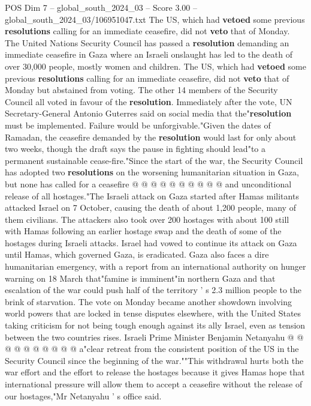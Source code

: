 \begin{textsample}{POS Dim 7 – global\_south\_2024\_03 – Score 3.00 – global\_south\_2024\_03/106951047.txt}  \label{ex:f7_pos_022}
The US, which had \textbf{vetoed} some previous \textbf{resolutions} calling for an immediate ceasefire, did not \textbf{veto} that of Monday.
The United Nations Security Council has passed a \textbf{resolution} demanding an immediate ceasefire in Gaza where an Israeli onslaught has led to the death of over 30,000 people, mostly women and children.
The US, which had \textbf{vetoed} some previous \textbf{resolutions} calling for an immediate ceasefire, did not \textbf{veto} that of Monday but abstained from voting.
The other 14 members of the Security Council all voted in favour of the \textbf{resolution}.
Immediately after the vote, UN Secretary-General Antonio Guterres said on social media that the"\textbf{resolution} must be implemented.
Failure would be unforgivable."Given the dates of Ramadan, the ceasefire demanded by the \textbf{resolution} would last for only about two weeks, though the draft says the pause in fighting should lead"to a permanent sustainable cease-fire."Since the start of the war, the Security Council has adopted two \textbf{resolutions} on the worsening humanitarian situation in Gaza, but none has called for a ceasefire @ @ @ @ @ @ @ @ @ @ and unconditional release of all hostages."The Israeli attack on Gaza started after Hamas militants attacked Israel on 7 October, causing the death of about 1,200 people, many of them civilians.
The attackers also took over 200 hostages with about 100 still with Hamas following an earlier hostage swap and the death of some of the hostages during Israeli attacks.
Israel had vowed to continue its attack on Gaza until Hamas, which governed Gaza, is eradicated.
Gaza also faces a dire humanitarian emergency, with a report from an international authority on hunger warning on 18 March that"famine is imminent"in northern Gaza and that escalation of the war could push half of the territory ' s 2.3 million people to the brink of starvation.
The vote on Monday became another showdown involving world powers that are locked in tense disputes elsewhere, with the United States taking criticism for not being tough enough against its ally Israel, even as tension between the two countries rises.
Israeli Prime Minister Benjamin Netanyahu @ @ @ @ @ @ @ @ @ @ a"clear retreat from the consistent position of the US in the Security Council since the beginning of the war.""This withdrawal hurts both the war effort and the effort to release the hostages because it gives Hamas hope that international pressure will allow them to accept a ceasefire without the release of our hostages,"Mr Netanyahu ' s office said.

\end{textsample}
